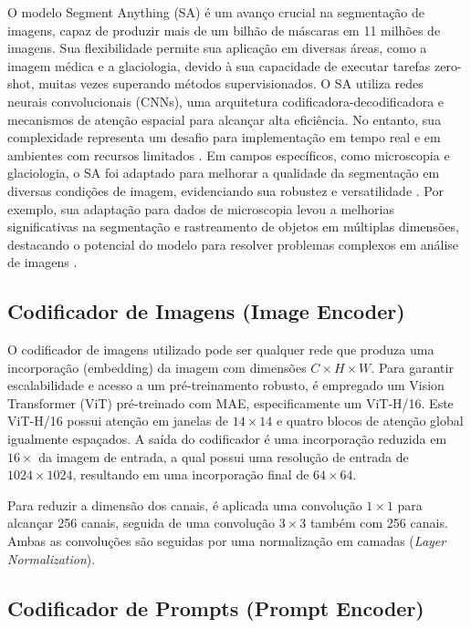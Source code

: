 O modelo Segment Anything (SA) é um avanço crucial na segmentação de imagens, capaz de produzir mais de um bilhão de máscaras em 11 milhões de imagens. Sua flexibilidade permite sua aplicação em diversas áreas, como a imagem médica e a glaciologia, devido à sua capacidade de executar tarefas zero-shot, muitas vezes superando métodos supervisionados. O SA utiliza redes neurais convolucionais (CNNs), uma arquitetura codificadora-decodificadora e mecanismos de atenção espacial para alcançar alta eficiência. No entanto, sua complexidade representa um desafio para implementação em tempo real e em ambientes com recursos limitados \cite{kirillov2023segany}.
Em campos específicos, como microscopia e glaciologia, o SA foi adaptado para melhorar a qualidade da segmentação em diversas condições de imagem, evidenciando sua robustez e versatilidade \cite{zhongkai_yuan_2024}. 
Por exemplo, sua adaptação para dados de microscopia levou a melhorias significativas na segmentação e rastreamento de objetos em múltiplas dimensões, destacando o potencial do modelo para resolver problemas complexos em análise de imagens \cite{anwai_archit__2023}.

\subsection{Codificador de Imagens (Image Encoder)}

O codificador de imagens utilizado pode ser qualquer rede que produza uma incorporação (embedding) da imagem com dimensões \(C \times H \times W\). Para garantir escalabilidade e acesso a um pré-treinamento robusto, é empregado um Vision Transformer (ViT) pré-treinado com MAE, especificamente um ViT-H/16. Este ViT-H/16 possui atenção em janelas de \(14 \times 14\) e quatro blocos de atenção global igualmente espaçados. A saída do codificador é uma incorporação reduzida em \(16\times\) da imagem de entrada, a qual possui uma resolução de entrada de \(1024 \times 1024\), resultando em uma incorporação final de \(64 \times 64\).

Para reduzir a dimensão dos canais, é aplicada uma convolução \(1 \times 1\) para alcançar 256 canais, seguida de uma convolução \(3 \times 3\) também com 256 canais. Ambas as convoluções são seguidas por uma normalização em camadas (\textit{Layer Normalization}).

\subsection{Codificador de Prompts (Prompt Encoder)}

